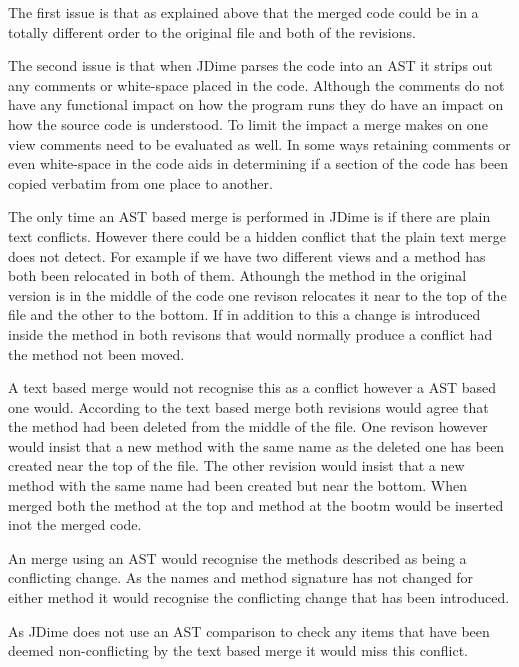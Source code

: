 The first issue is that as explained above that the merged code could be in a totally different order to the original file and both of the revisions.

The second issue is that when JDime parses the code into an AST it strips out any comments or white-space placed in the code.  Although the comments do not have any functional impact on how the program runs they do have an impact on how the source code is understood.  To limit the impact a merge makes on one view comments need to be evaluated as well. In some ways retaining comments or even white-space in the code aids in determining if a section of the code has been copied verbatim from one place to another.

The only time an AST based merge is performed in JDime is if there are plain text conflicts.  However there could be a hidden conflict that the plain text merge does not detect.  For example if we have two different views and a method has both been relocated in both of them.  Athoungh the method in the original version is in the middle of the code one revison relocates it near to the top of the file and the other to the bottom.  If in addition to this a change is introduced inside the method in both revisons that would normally produce a conflict had the method not been moved.

A text based merge would not recognise this as a conflict however a AST based one would. According to the text based merge both revisions would agree that the method had been deleted from the middle of the file.  One revison however would insist that a new method with the same name as the deleted one has been created near the top of the file.  The other revision would insist that a new method with the same name had been created but near the bottom. When merged both the method at the top and method at the bootm would be inserted inot the merged code.  

An merge using an AST would recognise the methods described as being a conflicting change.  As the names and method signature has not changed for either method it would recognise the conflicting change that has been introduced.

As JDime does not use an AST comparison to check any items that have been deemed non-conflicting by the text based merge it would miss this conflict.

